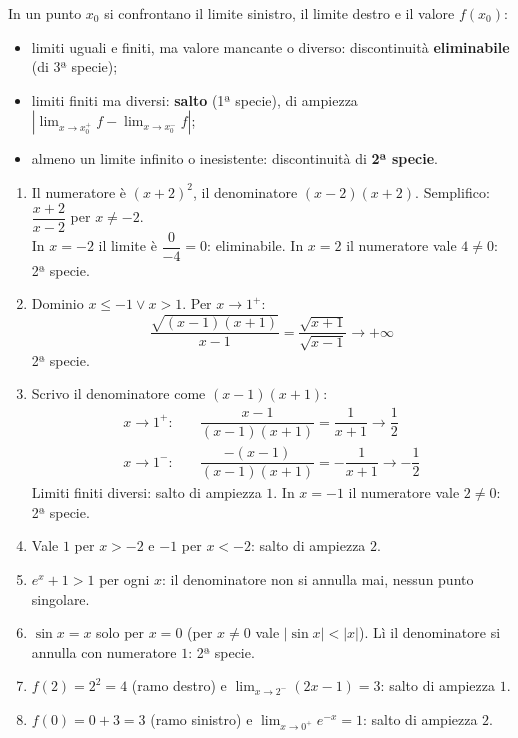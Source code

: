 \begin{question}[ID=2.5, subtitle={Punti singolari — serie 5}, tags={continuità, punti singolari}, difficulty=media]
\begin{explanation}
In un punto $x_0$ si confrontano il limite sinistro, il limite destro e il valore $f(x_0)$:
\begin{itemize}
    \item limiti uguali e finiti, ma valore mancante o diverso: discontinuità \textbf{eliminabile} (di 3ª specie);
    \item limiti finiti ma diversi: \textbf{salto} (1ª specie), di ampiezza $|\lim_{x\to x_0^+}f-\lim_{x\to x_0^-}f|$;
    \item almeno un limite infinito o inesistente: discontinuità di \textbf{2ª specie}.
\end{itemize}
\begin{enumerate}[label=\arabic*)]
    \item Il numeratore è $(x+2)^2$, il denominatore $(x-2)(x+2)$. Semplifico: $\dfrac{x+2}{x-2}$ per $x\neq-2$. \\
    In $x=-2$ il limite è $\dfrac{0}{-4}=0$: eliminabile. In $x=2$ il numeratore vale $4\neq0$: 2ª specie.
    \item Dominio $x\leq-1 \vee x>1$. Per $x\to1^+$:
    \[ \dfrac{\sqrt{(x-1)(x+1)}}{x-1}=\dfrac{\sqrt{x+1}}{\sqrt{x-1}}\to+\infty \]
    2ª specie.
    \item Scrivo il denominatore come $(x-1)(x+1)$:
    \[\begin{aligned}
    x\to1^+: &\quad \dfrac{x-1}{(x-1)(x+1)}=\dfrac{1}{x+1}\to\dfrac12\\
    x\to1^-: &\quad \dfrac{-(x-1)}{(x-1)(x+1)}=-\dfrac{1}{x+1}\to-\dfrac12
    \end{aligned}\]
    Limiti finiti diversi: salto di ampiezza $1$. In $x=-1$ il numeratore vale $2\neq0$: 2ª specie.
    \item Vale $1$ per $x>-2$ e $-1$ per $x<-2$: salto di ampiezza $2$.
    \item $e^x+1>1$ per ogni $x$: il denominatore non si annulla mai, nessun punto singolare.
    \item $\sin x=x$ solo per $x=0$ (per $x\neq0$ vale $|\sin x|<|x|$). Lì il denominatore si annulla con numeratore $1$: 2ª specie.
    \item $f(2)=2^2=4$ (ramo destro) e $\displaystyle\lim_{x\to2^-}(2x-1)=3$: salto di ampiezza $1$.
    \item $f(0)=0+3=3$ (ramo sinistro) e $\displaystyle\lim_{x\to0^+}e^{-x}=1$: salto di ampiezza $2$.
\end{enumerate}
\end{explanation}
\end{question}


